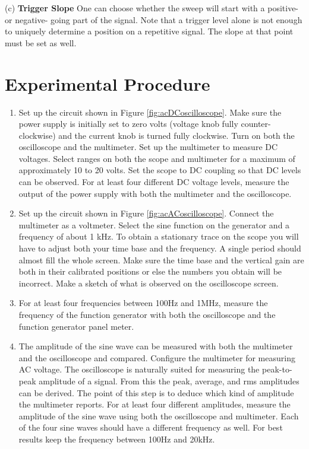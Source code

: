 \begin{enumerate}
(c) {\bf Trigger Slope} One can choose whether the sweep will start with a positive- or negative- going  part of the signal. Note that a trigger level alone is not enough to uniquely determine a position on a repetitive signal. The slope at that point must be set as well.
\end{enumerate}

\section{{\bf Experimental Procedure}}

\begin{enumerate}
\item Set up the circuit shown in Figure \ref{fig:acDCoscilloscope}. Make sure the power supply is initially set to zero volts (voltage knob fully counter-clockwise) and the current knob is turned fully clockwise. Turn on both the oscilloscope and the multimeter. Set up the multimeter to measure DC voltages. Select ranges on both the scope and multimeter for a maximum of approximately 10 to 20 volts. Set the scope to DC coupling so that DC levels can be observed. For at least four different DC voltage levels, measure the output of the power supply with both the multimeter and the oscilloscope.

\item Set up the circuit shown in Figure \ref{fig:acACoscilloscope}. Connect the multimeter as a voltmeter. Select the sine function on the generator and a frequency of about 1 kHz. To obtain a stationary trace on the scope you will have to adjust both your time base and the frequency. A single period should almost fill the whole screen. Make sure the time base and the vertical gain are both in their calibrated positions or else the numbers you obtain will be incorrect. Make a sketch of what is observed on the oscilloscope screen.

\item For at least four frequencies between 100Hz and 1MHz, measure the frequency of the function generator with both the oscilloscope and the function generator panel meter.

\item The amplitude of the sine wave can be measured with both the multimeter and the oscilloscope and compared. Configure the multimeter for measuring AC voltage. The oscilloscope is naturally suited for measuring the peak-to-peak amplitude of a signal. From this the peak, average, and rms amplitudes can be derived. The point of this step is to deduce which kind of amplitude the multimeter reports. For at least four different amplitudes, measure the amplitude of the sine wave using both the oscilloscope and multimeter. Each of the four sine waves should have a different frequency as well. For best results keep the frequency between 100Hz and 20kHz. 


\end{enumerate}
